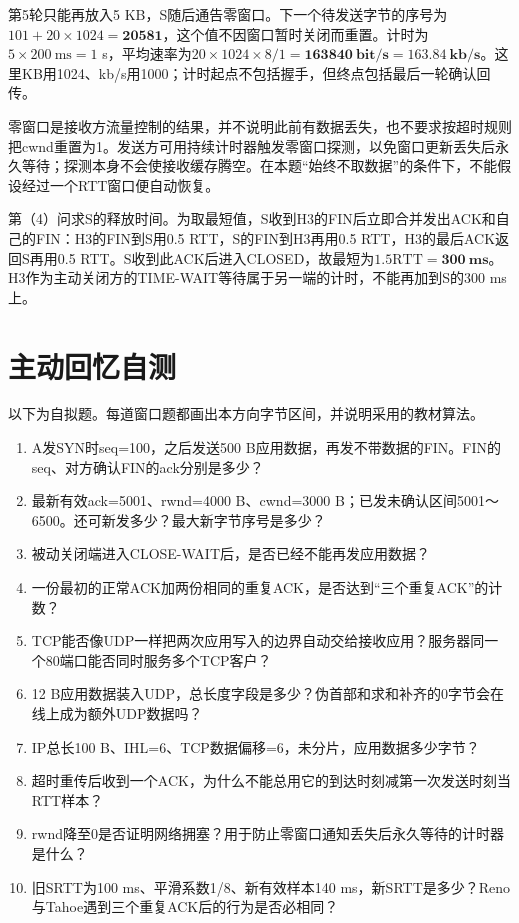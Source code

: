 第5轮只能再放入5 KB，S随后通告零窗口。下一个待发送字节的序号为\(101+20\times1024=\mathbf{20581}\)，这个值不因窗口暂时关闭而重置。计时为\(5\times200\mathrm{\ ms}=1\) s，平均速率为\(20\times1024\times8/1=\mathbf{163840\ bit/s}=\mathbf{163.84\ kb/s}\)。这里KB用1024、kb/s用1000；计时起点不包括握手，但终点包括最后一轮确认回传。

零窗口是接收方流量控制的结果，并不说明此前有数据丢失，也不要求按超时规则把cwnd重置为1。发送方可用持续计时器触发零窗口探测，以免窗口更新丢失后永久等待；探测本身不会使接收缓存腾空。在本题``始终不取数据''的条件下，不能假设经过一个RTT窗口便自动恢复。

第（4）问求S的释放时间。为取最短值，S收到H3的FIN后立即合并发出ACK和自己的FIN：H3的FIN到S用0.5 RTT，S的FIN到H3再用0.5 RTT，H3的最后ACK返回S再用0.5 RTT。S收到此ACK后进入CLOSED，故最短为\(1.5\mathrm{RTT}=\mathbf{300\ ms}\)。H3作为主动关闭方的TIME-WAIT等待属于另一端的计时，不能再加到S的300 ms上。

\section{主动回忆自测}\label{CN05-review}

以下为自拟题。每道窗口题都画出本方向字节区间，并说明采用的教材算法。

\begin{enumerate}
\def\labelenumi{\arabic{enumi}.}
\tightlist
\item
  A发SYN时seq=100，之后发送500 B应用数据，再发不带数据的FIN。FIN的seq、对方确认FIN的ack分别是多少？
\item
  最新有效ack=5001、rwnd=4000 B、cwnd=3000 B；已发未确认区间5001～6500。还可新发多少？最大新字节序号是多少？
\item
  被动关闭端进入CLOSE-WAIT后，是否已经不能再发应用数据？
\item
  一份最初的正常ACK加两份相同的重复ACK，是否达到``三个重复ACK''的计数？
\item
  TCP能否像UDP一样把两次应用写入的边界自动交给接收应用？服务器同一个80端口能否同时服务多个TCP客户？
\item
  12 B应用数据装入UDP，总长度字段是多少？伪首部和求和补齐的0字节会在线上成为额外UDP数据吗？
\item
  IP总长100 B、IHL=6、TCP数据偏移=6，未分片，应用数据多少字节？
\item
  超时重传后收到一个ACK，为什么不能总用它的到达时刻减第一次发送时刻当RTT样本？
\item
  rwnd降至0是否证明网络拥塞？用于防止零窗口通知丢失后永久等待的计时器是什么？
\item
  旧SRTT为100 ms、平滑系数1/8、新有效样本140 ms，新SRTT是多少？Reno与Tahoe遇到三个重复ACK后的行为是否必相同？
\end{enumerate}

